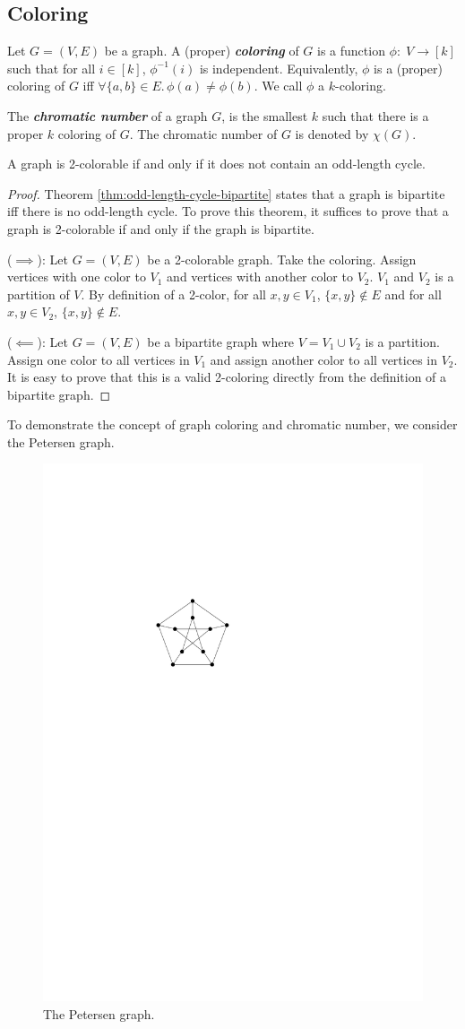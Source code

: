 \subsection{Coloring}

\begin{definition}
    Let $G = (V,E)$ be a graph. A (proper) \textit{\textbf{coloring}} of $G$ is a function $\phi:\; V \to [k]$ such that for all $i \in [k]$, $\phi^{-1}(i)$ is independent. Equivalently, $\phi$ is a (proper) coloring of $G$ iff $\forall \{a,b\} \in E.\, \phi(a) \neq \phi(b)$. We call $\phi$ a $k$-coloring.
\end{definition}

\begin{definition}
    The \textit{\textbf{chromatic number}} of a graph $G$, is the smallest $k$ such that there is a proper $k$ coloring of $G$. The chromatic number of $G$ is denoted by $\chi(G)$.
\end{definition}

\begin{theorem}
    A graph is 2-colorable if and only if it does not contain an odd-length cycle.
\end{theorem}

\begin{proof}
    Theorem \ref{thm:odd-length-cycle-bipartite} states that a graph is bipartite iff there is no odd-length cycle. To prove this theorem, it suffices to prove that a graph is 2-colorable if and only if the graph is bipartite.

    ($\implies$): Let $G = (V,E)$ be a 2-colorable graph. Take the coloring. Assign vertices with one color to $V_1$ and vertices with another color to $V_2$. $V_1$ and $V_2$ is a partition of $V$. By definition of a 2-color, for all $x,y \in V_1$, $\{x,y\} \not\in E$ and for all $x,y \in V_2$, $\{x,y\} \not\in E$.

    ($\impliedby$): Let $G=(V,E)$ be a bipartite graph where $V = V_1 \cup V_2$ is a partition. Assign one color to all vertices in $V_1$ and assign another color to all vertices in $V_2$. It is easy to prove that this is a valid 2-coloring directly from the definition of a bipartite graph.
\end{proof}

To demonstrate the concept of graph coloring and chromatic number, we consider the Petersen graph.

\begin{figure}[htbp]
    \centering
    \includegraphics[width=0.2\linewidth]{figures/peterson-graph.pdf}
    \caption{The Petersen graph.}
    \label{fig:petersen-graph}
\end{figure}

